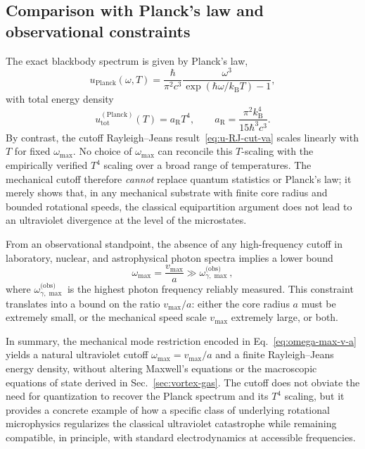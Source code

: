 \documentclass[11pt]{article}
\begin{document}
        \subsection{Comparison with Planck's law and observational constraints}

            The exact blackbody spectrum is given by Planck's law,
            \begin{equation}
                u_{\mathrm{Planck}}(\omega,T)
                = \frac{\hbar}{\pi^2 c^3}
                \frac{\omega^3}{\exp(\hbar\omega/k_{\mathrm B}T)-1},
            \end{equation}
            with total energy density
            \begin{equation}
                u_{\mathrm{tot}}^{(\mathrm{Planck})}(T)
                = a_{\mathrm R} T^4, \qquad
                a_{\mathrm R} = \frac{\pi^2 k_{\mathrm B}^4}{15\hbar^3 c^3}.
            \end{equation}
            By contrast, the cutoff Rayleigh--Jeans result~\eqref{eq:u-RJ-cut-va} scales linearly
            with $T$ for fixed $\omega_{\max}$. No choice of $\omega_{\max}$ can reconcile this
            $T$-scaling with the empirically verified $T^4$ scaling over a broad range of
            temperatures. The mechanical cutoff therefore \emph{cannot} replace quantum statistics
            or Planck's law; it merely shows that, in any mechanical substrate with finite core
            radius and bounded rotational speeds, the classical equipartition argument does not
            lead to an ultraviolet divergence at the level of the microstates.

            From an observational standpoint, the absence of any high-frequency cutoff in
            laboratory, nuclear, and astrophysical photon spectra implies a lower bound
            \begin{equation}
                \omega_{\max} = \frac{v_{\max}}{a}
                \gg \omega_{\gamma,\max}^{\text{(obs)}},
            \end{equation}
            where $\omega_{\gamma,\max}^{\text{(obs)}}$ is the highest photon frequency reliably
            measured. This constraint translates into a bound on the ratio $v_{\max}/a$:
            either the core radius $a$ must be extremely small, or the mechanical speed
            scale $v_{\max}$ extremely large, or both.

            In summary, the mechanical mode restriction encoded in Eq.~\eqref{eq:omega-max-v-a}
            yields a natural ultraviolet cutoff $\omega_{\max} = v_{\max}/a$ and a finite
            Rayleigh--Jeans energy density, without altering Maxwell's equations or the
            macroscopic equations of state derived in Sec.~\ref{sec:vortex-gas}. The cutoff
            does not obviate the need for quantization to recover the Planck spectrum and its
            $T^4$ scaling, but it provides a concrete example of how a specific class of
            underlying rotational microphysics regularizes the classical ultraviolet catastrophe
            while remaining compatible, in principle, with standard electrodynamics at accessible
            frequencies.
\end{document}
